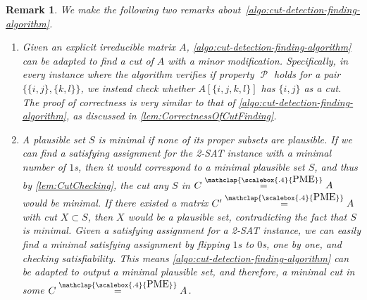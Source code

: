 \documentclass[11pt,letterpaper]{article}
\newcommand{\sgc}[1]{\textcolor{orange}{\guillemotleft \textbf{Sumanta:} #1\guillemotright}}
\newtheorem{remark}{Remark}[section]
\DeclareMathOperator{\calP}{\mathcal{P}}
\newcommand{\pp}[2]{\{\{#1\},\{#2\}\}}
\newcommand{\PME}{\stackrel{\mathclap{\scalebox{.4}{\mbox{PME}}}}{=}}
\begin{document}
{{{%
\begin{remark} 
\label{rem:cut-finding}
We make the following two remarks about~\cref{algo:cut-detection-finding-algorithm}.
\begin{enumerate}
\item \label{rem:ExplicitCutFinding}
 Given an explicit irreducible matrix $A$, \cref{algo:cut-detection-finding-algorithm} can be adapted to find a cut of $A$ with a minor modification. Specifically, in every instance where the algorithm verifies if property $\calP$ holds for a pair $\pp{i,j}{k,l}$, we instead check whether $A[\{i,j,k,l\}]$ has $\{i,j\}$ as a cut. The proof of correctness is very similar to that of \cref{algo:cut-detection-finding-algorithm}, as discussed in \cref{lem:CorrectnessOfCutFinding}.
\item \label{rem:MinimalCutFinding}
A plausible set $S$ is \emph{minimal} if none of its proper subsets are plausible. If we can find a satisfying assignment for the 2-SAT instance with a minimal number of $1$s, then it would correspond to a minimal plausible set $S$, and thus by \cref{lem:CutChecking}, the cut any $S$ in $C \PME A$ would be minimal. If there existed a matrix $C' \PME A$ with cut $X \subset S$, then $X$ would be a plausible set, contradicting the fact that $S$ is minimal. Given a satisfying assignment for a 2-SAT instance, we can easily find a minimal satisfying assignment by flipping $1$s to $0$s, one by one, and checking satisfiability. This means \cref{algo:cut-detection-finding-algorithm} can be adapted to output a minimal plausible set, and therefore, a minimal cut in some $C \PME A$.
\end{enumerate}
 \end{remark} %

}}}
\end{document}
